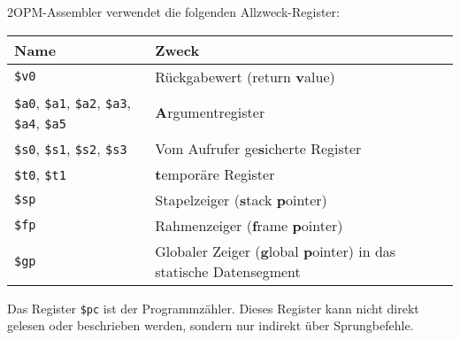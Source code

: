 \documentclass[11pt,a4paper]{article}
\begin{document}


2OPM-Assembler verwendet die folgenden Allzweck-Register:


  \begin{tabular}{|p{6cm}|p{6cm}|}
    \hline
    \textbf{Name} & \textbf{Zweck} \\
    \hline
    \hline
    \texttt{\$v0} & Rückgabewert (return \textbf{v}alue)\\
    \texttt{\$a0}, \texttt{\$a1}, \texttt{\$a2}, \texttt{\$a3}, \texttt{\$a4}, \texttt{\$a5} & \textbf{A}rgumentregister\\
    \texttt{\$s0}, \texttt{\$s1}, \texttt{\$s2}, \texttt{\$s3} & Vom Aufrufer ge\textbf{s}icherte Register \\
    \texttt{\$t0}, \texttt{\$t1} & \textbf{t}emporäre Register \\
    \texttt{\$sp} & Stapelzeiger (\textbf{s}tack \textbf{p}ointer)\\
    \texttt{\$fp} & Rahmenzeiger (\textbf{f}rame \textbf{p}ointer)\\
    \texttt{\$gp} & Globaler Zeiger (\textbf{g}lobal \textbf{p}ointer) in das statische Datensegment\\
    \hline
  \end{tabular}


Das Register \texttt{\$pc} ist der Programmzähler.  Dieses Register kann nicht direkt gelesen oder beschrieben werden, sondern nur indirekt über Sprungbefehle.
\end{document}
